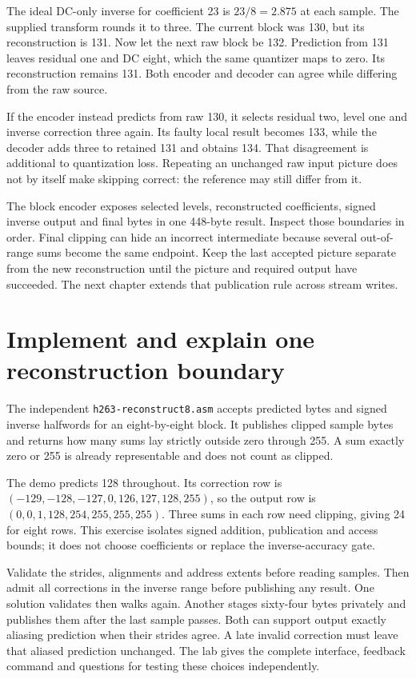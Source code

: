 The ideal DC-only inverse for coefficient 23 is $23/8=2.875$ at each sample.
The supplied transform rounds it to three. The current block was 130, but its
reconstruction is 131. Now let the next raw block be 132. Prediction from 131
leaves residual one and DC eight, which the same quantizer maps to zero. Its
reconstruction remains 131. Both encoder and decoder can agree while differing
from the raw source.

If the encoder instead predicts from raw 130, it selects residual two, level one
and inverse correction three again. Its faulty local result becomes 133, while
the decoder adds three to retained 131 and obtains 134. That disagreement is
additional to quantization loss. Repeating an unchanged raw input picture does
not by itself make skipping correct: the reference may still differ from it.

The block encoder exposes selected levels, reconstructed coefficients, signed
inverse output and final bytes in one 448-byte result. Inspect those boundaries
in order. Final clipping can hide an incorrect intermediate because several
out-of-range sums become the same endpoint. Keep the last accepted picture
separate from the new reconstruction until the picture and required output have
succeeded. The next chapter extends that publication rule across stream writes.



\section{Implement and explain one reconstruction boundary}

The independent \texttt{h263-reconstruct8.asm} accepts predicted bytes and signed
inverse halfwords for an eight-by-eight block. It publishes clipped sample bytes
and returns how many sums lay strictly outside zero through 255. A sum exactly
zero or 255 is already representable and does not count as clipped.

The demo predicts 128 throughout. Its correction row is
$(-129,-128,-127,0,126,127,128,255)$, so the output row is
$(0,0,1,128,254,255,255,255)$. Three sums in each row need clipping, giving 24
for eight rows. This exercise isolates signed addition, publication and access
bounds; it does not choose coefficients or replace the inverse-accuracy gate.

Validate the strides, alignments and address extents before reading samples.
Then admit all corrections in the inverse range before publishing any result.
One solution validates then walks again. Another stages sixty-four bytes privately
and publishes them after the last sample passes. Both can support output exactly
aliasing prediction when their strides agree. A late invalid correction must leave
that aliased prediction unchanged. The lab gives the complete interface, feedback
command and questions for testing these choices independently.

